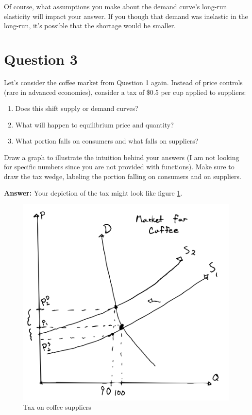 \documentclass[12pt]{article}
\begin{document}
\vspace{2mm}

Of course, what assumptions you make about the demand curve's long-run elasticity will impact your answer. If you though that demand was inelastic in the long-run, it's possible that the shortage would be smaller.

\section*{Question 3}
Let's consider the coffee market from Question 1 again. Instead of price controls (rare in advanced economies), consider a tax of \$0.5 per cup applied to suppliers:

\begin{enumerate}
    \item Does this shift supply or demand curves?
    \item What will happen to equilibrium price and quantity?
    \item What portion falls on consumers and what falls on suppliers?
\end{enumerate}

Draw a graph to illustrate the intuition behind your answers (I am not looking for specific numbers since you are not provided with functions). Make sure to draw the tax wedge, labeling the portion falling on consumers and on suppliers.

\textbf{Answer:}
Your depiction of the tax might look like figure \ref{fig:coffee_tax_1}.

\begin{figure}
    \centering
    \includegraphics[width=.6\textwidth]{coffee_tax_1.png}
    \caption{Tax on coffee suppliers}
    \label{fig:coffee_tax_1}
\end{figure}
\end{document}
